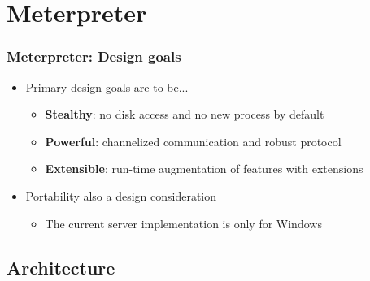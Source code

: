 \documentclass{beamer}
\newenvironment{sitemize}{\vspace{1mm}\begin{itemize}\itemsep 4pt\small}{\end{itemize}}
\begin{document}
%
%

%
%
\section{Meterpreter}

\begin{frame}[t]
    \frametitle{Meterpreter: Design goals}

    \begin{sitemize}
        \item Primary design goals are to be...
        \begin{sitemize}
            \pause
            \item \textbf{Stealthy}: no disk access and no new process by default
            \pause
            \item \textbf{Powerful}: channelized communication and robust protocol
            \pause
            \item \textbf{Extensible}: run-time augmentation of features with extensions
        \end{sitemize}

        \pause
        \item Portability also a design consideration
        \begin{sitemize}
            \item The current server implementation is only for
            Windows
        \end{sitemize}
    \end{sitemize}

\end{frame}

\subsection{Architecture}
\end{document}
